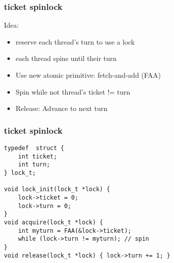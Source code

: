 \begin{frame}[fragile]
    \frametitle{ticket spinlock}
    \Large
    Idea:
    \begin{itemize}
        \item reserve each thread's turn to use a lock
        \item each thread spins until their turn
        \item Use new atomic primitive:
        fetch-and-add (FAA)
        \item Spin while not thread's ticket != turn
        \item Release: Advance to next turn
        
 \end{itemize}
    
\end{frame}


\begin{frame}[fragile]
    \frametitle{ticket spinlock}
    \begin{block}{}
        \begin{verbatim}
typedef  struct {
    int ticket;
    int turn;
} lock_t;

void lock_init(lock_t *lock) {
    lock->ticket = 0;
    lock->turn = 0;
}
void acquire(lock_t *lock) {
    int myturn = FAA(&lock->ticket);
    while (lock->turn != myturn); // spin
}
void release(lock_t *lock) { lock->turn += 1; }

        \end{verbatim}
    \end{block} 
\end{frame}

